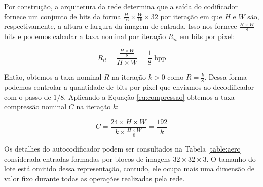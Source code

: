 Por construção, a arquitetura da rede determina que a saída do codificador fornece um conjunto de bits da forma $\frac{H}{16} \times \frac{W}{16} \times 32$ por iteração em que $H$ e $W$ são, respectivamente, a altura e largura da imagem de entrada. Isso nos fornece $\frac{H \times W}{8}$ bits e podemos calcular a taxa nominal por iteração $R_{it}$ em bits por pixel:

\begin{equation}
\label{eq:bpp}
R_{it} = \frac{\frac{H \times W}{8}}{H \times W} =  \frac{1}{8}\text{ bpp} 
\end{equation}

Então, obtemos a taxa nominal $R$ na iteração $k>0$ como $R =\frac{k}{8} $.  Dessa forma podemos controlar a quantidade de bits por pixel que enviamos ao decodificador com o passo de $1/8$. Aplicando a Equação \ref{eq:compressao} obtemos a taxa compressão nominal $C$ na iteração $k$: 

\begin{equation}
\label{eq:tc}
C = \frac{24 \times H \times W}{k \times \frac{H \times W}{8}} =  \frac{192}{k} 
\end{equation}


Os detalhes do autocodificador podem ser consultados na Tabela \ref{table:aerc} considerada entradas formadas por blocos de imagens $32 \times 32 \times 3$. O tamanho do lote está omitido dessa representação, contudo,  ele ocupa mais uma dimensão de valor fixo durante todas as operações realizadas pela rede.

